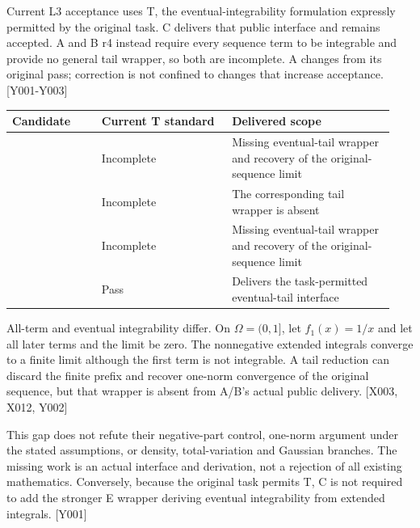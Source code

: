 Current L3 acceptance uses T, the eventual-integrability formulation expressly permitted by the original task. C delivers that public interface and remains accepted. A and B r4 instead require every sequence term to be integrable and provide no general tail wrapper, so both are incomplete. A changes from its original pass; correction is not confined to changes that increase acceptance. [Y001-Y003]

\begingroup\small\setlength{\tabcolsep}{3pt}\renewcommand{\arraystretch}{1.14}
\par\nopagebreak\medskip\noindent\begin{minipage}[t]{\linewidth}
\begin{tabular}{>{\raggedright\arraybackslash}p{0.22\linewidth}>{\raggedright\arraybackslash}p{0.32\linewidth}>{\raggedright\arraybackslash}p{0.4\linewidth}}
\toprule
\textbf{Candidate} & \textbf{Current T standard} & \textbf{Delivered scope}\\\midrule

{A} & {Incomplete} & {Missing eventual-tail wrapper and recovery of the original-sequence limit}\\
{Early B} & {Incomplete} & {The corresponding tail wrapper is absent}\\
{B r4} & {Incomplete} & {Missing eventual-tail wrapper and recovery of the original-sequence limit}\\
{C} & {Pass} & {Delivers the task-permitted eventual-tail interface}\\
\bottomrule\end{tabular}\end{minipage}\par\medskip\endgroup
All-term and eventual integrability differ. On $\Omega=(0,1]$, let $f_1(x)=1/x$ and let all later terms and the limit be zero. The nonnegative extended integrals converge to a finite limit although the first term is not integrable. A tail reduction can discard the finite prefix and recover one-norm convergence of the original sequence, but that wrapper is absent from A/B's actual public delivery. [X003, X012, Y002]

This gap does not refute their negative-part control, one-norm argument under the stated assumptions, or density, total-variation and Gaussian branches. The missing work is an actual interface and derivation, not a rejection of all existing mathematics. Conversely, because the original task permits T, C is not required to add the stronger E wrapper deriving eventual integrability from extended integrals. [Y001]

